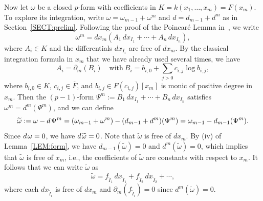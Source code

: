 \documentclass{amsart}
\theoremstyle{definition}
\numberwithin{equation}{section}
\numberwithin{thm}{section}
\begin{document}
Now let $\omega$ be a closed $p$-form with coefficients in $K = k(x_1, \ldots, x_m) = F(x_m)$.  To explore its integration, write $\omega = \omega_{m-1} + \omega^m$ and $d = d_{m-1} + d^m$ as in Section~\ref{SECT:prelim}. Following the proof of the Poincar\'e Lemma in~\cite{Weintraub}, we write
\[
\omega^m = dx_m(A_1 \, dx_{I_1} + \cdots + A_n \, dx_{I_n}),
\]
where $A_i \in K$ and the differentials $dx_{I_i}$ are free of $dx_m$. By the classical integration formula in $x_m$ that we have already used several times, we have
\[
A_i  = \partial_m(B_i) \quad \text{with}\ B_i = b_{i, 0} + \sum_{j>0} c_{i, j} \log b_{i, j},
\]
where  $b_{i, 0} \in K$, $c_{i, j} \in \overline{F}$, and $b_{i, j} \in F(c_{ i, j})[x_m]$ 
is monic of positive degree in~$x_m$.  %
Then the $(p-1)$-form $\Psi^m := B_1 \,dx_{I_1} + \cdots + B_n \,dx_{I_n}$ satisfies $\omega^m = d^m(\Psi^m)$, and we can define
\[
\widetilde{\omega} := \omega - d\hskip1pt\Psi^m = (\omega_{m-1} + \omega^m) - (d_{m-1} + d^m)(\Psi^m) = \omega_{m-1} - d_{m-1}(\Psi^m).
\]
Since $d\hskip1pt\omega =0$, we have $d\hskip1pt \widetilde{\omega}=0$. Note that $\widetilde{\omega}$ is free of $dx_m$. By {\rm(iv)} of Lemma~\ref{LEM:form}, we have $d_{m-1}(\widetilde{\omega})=0$ and $d^m(\widetilde{\omega})=0$, which implies that $\widetilde{\omega}$ is free of $x_m$, i.e., the coefficients of $\widetilde{\omega}$ are constants with respect to $x_m$. It follows that we can write $\widetilde{\omega}$ as
\[
\widetilde{\omega} = f_{\tilde I_1} \, dx_{\tilde I_1} + f_{\tilde I_2} \, dx_{\tilde I_2} + \cdots,
\]
where each $dx_{\tilde I_i}$ is free of $dx_m$ and $\partial_m(f_{\tilde I_i}) = 0$ since $d^m(\widetilde{\omega}) = 0$.
\end{document}
